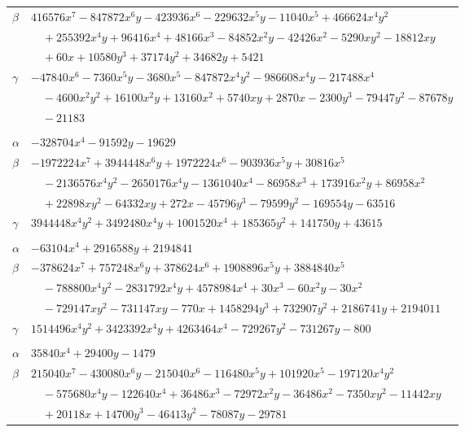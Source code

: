 \documentclass[11pt]{article}
\begin{document}
\begin{longtable}{@{}ll@{}}
$\beta$ & $416576x^{7}-847872x^{6}y-423936x^{6}-229632x^{5}y-11040x^{5}+466624x^{4}y^{2}$\\
 & $\quad +255392x^{4}y+96416x^{4}+48166x^{3}-84852x^{2}y-42426x^{2}-5290xy^{2}-18812xy$\\
 & $\quad +60x+10580y^{3}+37174y^{2}+34682y+5421$\\
$\gamma$ & $-47840x^{6}-7360x^{5}y-3680x^{5}-847872x^{4}y^{2}-986608x^{4}y-217488x^{4}$\\
 & $\quad -4600x^{2}y^{2}+16100x^{2}y+13160x^{2}+5740xy+2870x-2300y^{3}-79447y^{2}-87678y$\\
 & $\quad -21183$\\
\addlinespace[3pt]
\multicolumn{2}{@{}l}{$\{i,j\}=\{15,42\}$, $k_{ij}=2^{4}\cdot 17$}\\
$\alpha$ & $-328704x^{4}-91592y-19629$\\
$\beta$ & $-1972224x^{7}+3944448x^{6}y+1972224x^{6}-903936x^{5}y+30816x^{5}$\\
 & $\quad -2136576x^{4}y^{2}-2650176x^{4}y-1361040x^{4}-86958x^{3}+173916x^{2}y+86958x^{2}$\\
 & $\quad +22898xy^{2}-64332xy+272x-45796y^{3}-79599y^{2}-169554y-63516$\\
$\gamma$ & $3944448x^{4}y^{2}+3492480x^{4}y+1001520x^{4}+185365y^{2}+141750y+43615$\\
\addlinespace[3pt]
\multicolumn{2}{@{}l}{$\{i,j\}=\{15,64\}$, $k_{ij}=2\cdot 3^{5}\cdot 5$}\\
$\alpha$ & $-63104x^{4}+2916588y+2194841$\\
$\beta$ & $-378624x^{7}+757248x^{6}y+378624x^{6}+1908896x^{5}y+3884840x^{5}$\\
 & $\quad -788800x^{4}y^{2}-2831792x^{4}y+4578984x^{4}+30x^{3}-60x^{2}y-30x^{2}$\\
 & $\quad -729147xy^{2}-731147xy-770x+1458294y^{3}+732907y^{2}+2186741y+2194011$\\
$\gamma$ & $1514496x^{4}y^{2}+3423392x^{4}y+4263464x^{4}-729267y^{2}-731267y-800$\\
\addlinespace[3pt]
\multicolumn{2}{@{}l}{$\{i,j\}=\{15,74\}$, $k_{ij}=2\cdot 3^{3}\cdot 13\cdot 17$}\\
$\alpha$ & $35840x^{4}+29400y-1479$\\
$\beta$ & $215040x^{7}-430080x^{6}y-215040x^{6}-116480x^{5}y+101920x^{5}-197120x^{4}y^{2}$\\
 & $\quad -575680x^{4}y-122640x^{4}+36486x^{3}-72972x^{2}y-36486x^{2}-7350xy^{2}-11442xy$\\
 & $\quad +20118x+14700y^{3}-46413y^{2}-78087y-29781$\\

\end{longtable}
\end{document}
